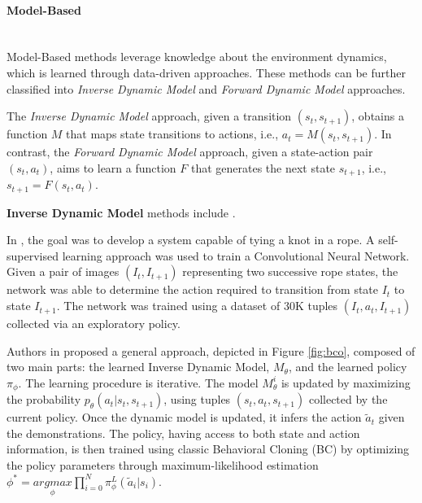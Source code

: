 

\paragraph*{Model-Based}\mbox{}\\
Model-Based methods leverage knowledge about the environment dynamics, which is learned through data-driven approaches. These methods can be further classified into \textit{Inverse Dynamic Model} and \textit{Forward Dynamic Model} approaches. 

The \textit{Inverse Dynamic Model} approach, given a transition $(s_{t}, s_{t+1})$, obtains a function $M$ that maps state transitions to actions, i.e., $a_{t} = M(s_{t}, s_{t+1})$. In contrast, the \textit{Forward Dynamic Model} approach, given a state-action pair $(s_{t}, a_{t})$, aims to learn a function $F$ that generates the next state $s_{t+1}$, i.e., $s_{t+1} = F(s_{t}, a_{t})$.

\textbf{Inverse Dynamic Model} methods include \cite{nair2017combining,torabi2018bco,guo2019hybrid_rl,radosavovic2021state_only_demo}.

In \cite{nair2017combining}, the goal was to develop a system capable of tying a knot in a rope. A self-supervised learning approach was used to train a Convolutional Neural Network. Given a pair of images $(I_{t}, I_{t+1})$ representing two successive rope states, the network was able to determine the action required to transition from state $I_{t}$ to state $I_{t+1}$. The network was trained using a dataset of 30K tuples $(I_{t}, a_{t}, I_{t+1})$ collected via an exploratory policy.

Authors in \cite{torabi2018bco} proposed a general approach, depicted in Figure \ref{fig:bco}, composed of two main parts: the learned Inverse Dynamic Model, $M_{\theta}$, and the learned policy $\pi_{\phi}$. The learning procedure is iterative. The model $M_{\theta}^{i}$ is updated by maximizing the probability $p_{\theta}(a_{t}|s_{t}, s_{t+1})$, using tuples $(s_{t}, a_{t}, s_{t+1})$ collected by the current policy. Once the dynamic model is updated, it infers the action $\tilde{a}_{t}$ given the demonstrations. The policy, having access to both state and action information, is then trained using classic Behavioral Cloning (BC) by optimizing the policy parameters through maximum-likelihood estimation $\phi^{*} = \underset{\phi}{argmax} \prod_{i=0}^{N} \pi^{L}_{\phi}(\tilde{a}_{i}|s_{i})$.

